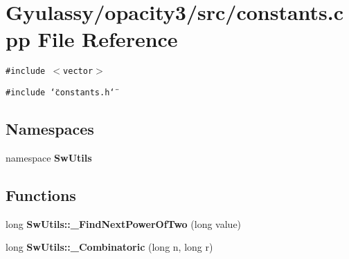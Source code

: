 \section{Gyulassy/opacity3/src/constants.cpp File Reference}
\label{constants_8cpp}
{\tt \#include $<$vector$>$}\par
{\tt \#include \char`\"{}constants.h\char`\"{}}\par
\subsection*{Namespaces}
\begin{CompactItemize}
\item 
namespace {\bf SwUtils}
\end{CompactItemize}
\subsection*{Functions}
\begin{CompactItemize}
\item 
long {\bf SwUtils::\_\-FindNextPowerOfTwo} (long value)
\item 
long {\bf SwUtils::\_\-Combinatoric} (long n, long r)
\end{CompactItemize}
